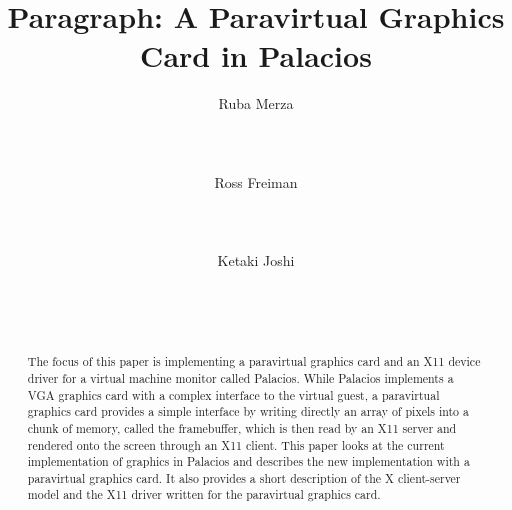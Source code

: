 \documentclass{acm_proc_article-sp}
\begin{document}
\title{Paragraph: A Paravirtual Graphics Card in Palacios}
\author{
\alignauthor
Ruba Merza\\
       \\
       \\
       \\
\alignauthor
Ross Freiman\\
       \\
       \\
       \\
\alignauthor
Ketaki Joshi\\
       \\
       \\
       \\
}

\maketitle
\begin{abstract}
The focus of this paper is implementing a paravirtual graphics card and an X11 device driver for
a virtual machine monitor called Palacios. While Palacios implements a VGA graphics card with
a complex interface to the virtual guest, a paravirtual graphics card provides a simple interface
by writing directly an array of pixels into a chunk of memory, called the framebuffer, which is then
read by an X11 server and rendered onto the screen through an X11 client.
This paper looks at the current implementation of graphics in Palacios and describes the new
implementation with a paravirtual graphics card. It also provides a short description of the X
client\--­server model and the X11 driver written for the paravirtual graphics card.
\end{abstract}

\end{document}
